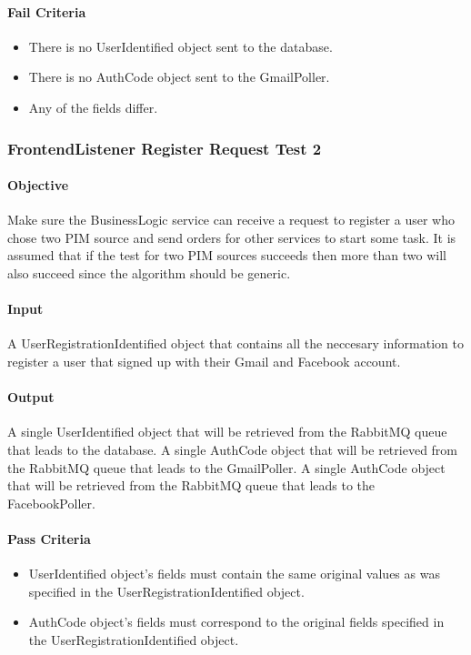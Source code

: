 \documentclass[hidelinks,english]{article}
\begin{document}
				\paragraph{Fail Criteria}
				\begin{itemize}
					\item There is no UserIdentified object sent to the database.
					\item There is no AuthCode object sent to the GmailPoller.
					\item Any of the fields differ.
				\end{itemize}
				
			\subsubsection{FrontendListener Register Request Test 2}\label{businessfrontendlistenerregistertest2}
				\paragraph{Objective} Make sure the BusinessLogic service can receive a request to register a user who chose two PIM source and send orders for other services to start some task. It is assumed that if the test for two PIM sources succeeds then more than two will also succeed since the algorithm should be generic.
				\paragraph{Input} A UserRegistrationIdentified object that contains all the neccesary information to register a user that signed up with their Gmail and Facebook account.
				\paragraph{Output} A single UserIdentified object that will be retrieved from the RabbitMQ queue that leads to the database. A single AuthCode object that will be retrieved from the RabbitMQ queue that leads to the GmailPoller. A single AuthCode object that will be retrieved from the RabbitMQ queue that leads to the FacebookPoller.
				\paragraph{Pass Criteria}
				\begin{itemize}
					\item UserIdentified object's fields must contain the same original values as was specified in the UserRegistrationIdentified object.
					\item AuthCode object's fields must correspond to the original fields specified in the UserRegistrationIdentified object.
				\end{itemize}
\end{document}
